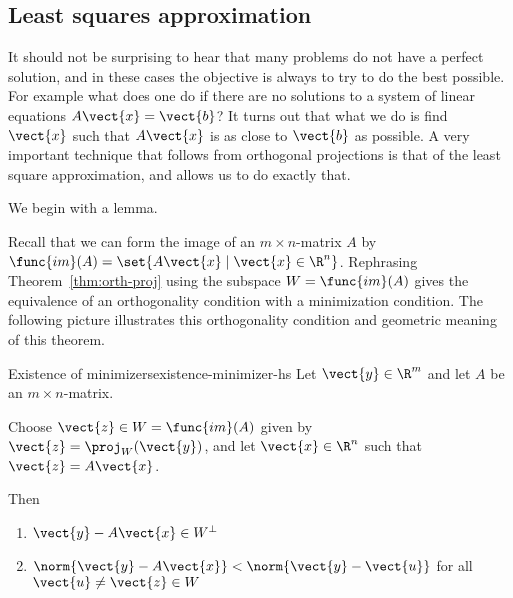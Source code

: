 \subsection{Least squares approximation}

It should not be surprising to hear that many problems do not have a
perfect solution, and in these cases the objective is always to try to
do the best possible. For example what does one do if there are no
solutions to a system of linear equations $A\vect{x}=\vect{b}$? It
turns out that what we do is find $\vect{x}$ such that $A\vect{x}$ is
as close to $\vect{b}$ as possible. A very important technique that
follows from orthogonal projections is that of the least square
approximation, and allows us to do
exactly that.

We begin with a lemma.

Recall that we can form the image of an $m \times n$-matrix $A$ by
$\func{im}(A) = \set{A\vect{x} \mid \vect{x} \in
\R^n }$. Rephrasing Theorem~\ref{thm:orth-proj} using
the subspace $W=\func{im}(A)$  gives the
equivalence of an orthogonality condition with a minimization
condition. The following picture
illustrates this orthogonality condition and geometric meaning of this
theorem.

\begin{center}
\end{center}

\begin{theorem}{Existence of minimizers}{existence-minimizer-hs}\label{existence-minimizer-hs}
Let $\vect{y}\in \R^{m}$ and let $A$ be an $m\times n$-matrix.

Choose $\vect{z}\in W= \func{im}(A)$ given by $\vect{z} =
\proj_{W}(\vect{y})$, and let $\vect{x} \in \R^{n}$ such that $\vect{z}=A\vect{x}$.

Then
\begin{enumerate}
\item $\vect{y} - A\vect{x} \in W^{\perp}$
\item $\norm{\vect{y} - A\vect{x}} < \norm{\vect{y} - \vect{u}}$ for all $\vect{u} \neq \vect{z} \in W$
\end{enumerate}
\end{theorem}

